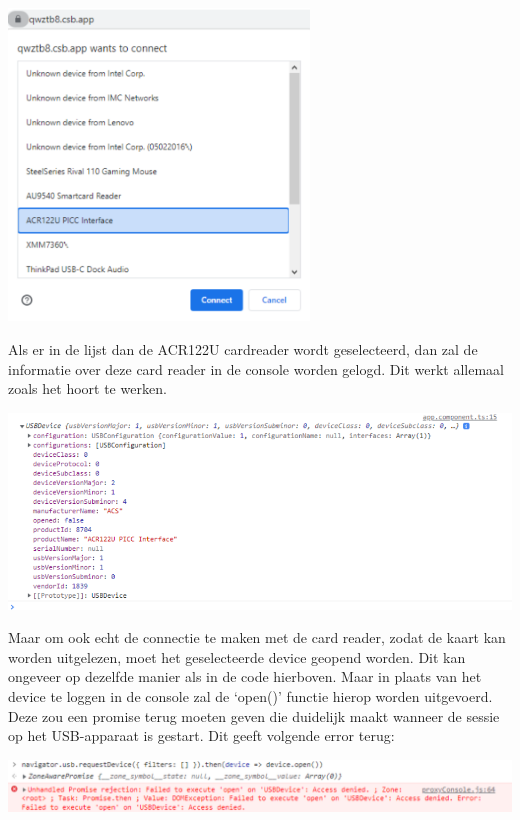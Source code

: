 \begin{center}
    \includegraphics[width=8cm]{device_list}
\end{center}

Als er in de lijst dan de ACR122U cardreader wordt geselecteerd, dan zal de informatie over deze card reader in de console worden gelogd. Dit werkt allemaal zoals het hoort te werken.

\begin{center}
    \includegraphics[width=16cm]{device_log}
\end{center}

Maar om ook echt de connectie te maken met de card reader, zodat de kaart kan worden uitgelezen, moet het geselecteerde device geopend worden. Dit kan ongeveer op dezelfde manier als in de code hierboven. Maar in plaats van het device te loggen in de console zal de ‘open()’ functie hierop worden uitgevoerd. Deze zou een promise terug moeten geven die duidelijk maakt wanneer de sessie op het USB-apparaat is gestart. Dit geeft volgende error terug: 

\begin{center}
    \includegraphics[width=16cm]{webusb_error}
\end{center}

